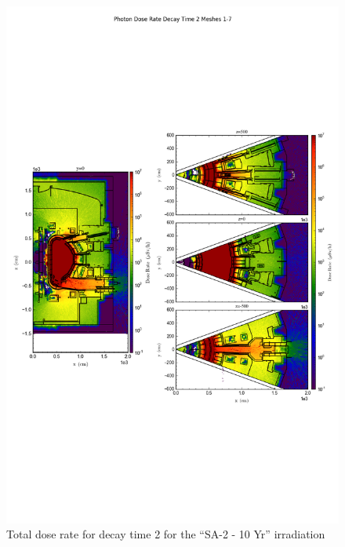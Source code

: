 \documentclass[12pt]{article}
\begin{document}
\begin{figure}[ht!]
\centering
\includegraphics[trim={0cm 8cm, 0cm 8cm},clip,scale=0.75]{../plots/final_model/5year/Photon_Dose_Rate_Decay_Time_2_Meshes_1-7.png}
\caption{Total dose rate for decay time 2 for the ``SA-2 - 10 Yr'' irradiation}
\label{fig:photons_5y_dc2_nob4c_dose}
\end{figure}
\end{document}
